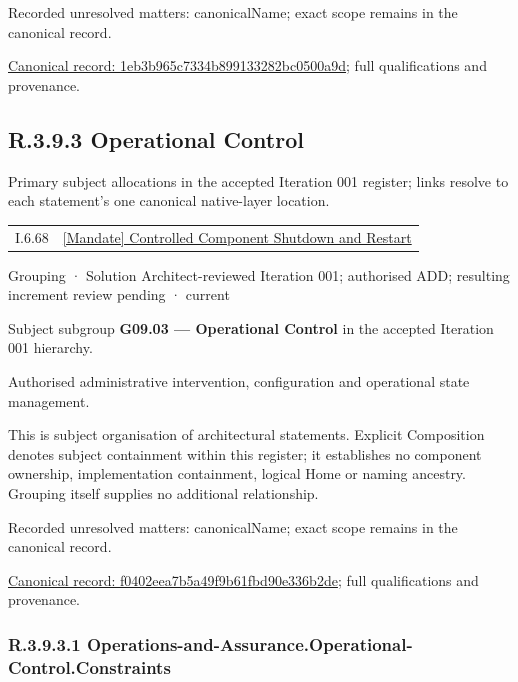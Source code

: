 {\small Recorded unresolved matters: canonicalName; exact scope remains in the canonical record.}\par
{\footnotesize \href{../../../../continuum/grouping/1eb3b965c7334b899133282bc0500a9d.md}{Canonical record: 1eb3b965c7334b899133282bc0500a9d}; full qualifications and provenance.}\par
\subsection*{R.3.9.3 Operational Control}
\label{navigation:R.3.9.3}

Primary subject allocations in the accepted Iteration 001 register; links resolve to each statement’s one canonical native-layer location.\par
\begin{longtable}{p{.22\linewidth}p{.73\linewidth}}
I.6.68 & \hyperref[element:96f7bfa320b049d2b76fcc35a1926883]{[Mandate] Controlled Component Shutdown and Restart} \\
\end{longtable}
\label{element:f0402eea7b5a49f9b61fbd90e336b2de}
{\small Grouping · Solution Architect-reviewed Iteration 001; authorised ADD; resulting increment review pending · current}\par

Subject subgroup \textbf{G09.03 — Operational Control} in the accepted Iteration 001 hierarchy.



Authorised administrative intervention, configuration and operational state management.



This is subject organisation of architectural statements. Explicit Composition denotes subject containment within this register; it establishes no component ownership, implementation containment, logical Home or naming ancestry. Grouping itself supplies no additional relationship.


{\small Recorded unresolved matters: canonicalName; exact scope remains in the canonical record.}\par
{\footnotesize \href{../../../../continuum/grouping/f0402eea7b5a49f9b61fbd90e336b2de.md}{Canonical record: f0402eea7b5a49f9b61fbd90e336b2de}; full qualifications and provenance.}\par
\subsubsection*{R.3.9.3.1 Operations-and-Assurance.Operational-Control.Constraints}
\label{navigation:R.3.9.3.1}

